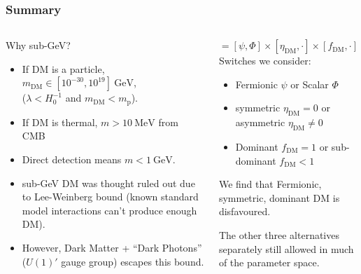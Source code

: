 \documentclass[aspectratio=169]{beamer}
\begin{document}
\begin{frame}
    \frametitle{Summary}

    \begin{columns}[t]
        \begin{block}{Why sub-GeV?}
            \begin{itemize}
                \item If DM is a particle, $m_\text{DM}\in[10^{-30},10^{19}]~\text{GeV}$, \\\hfill($\lambda<H_0^{-1}$ and $m_\text{DM} <m_\text{p}$).
                \item If DM is thermal, $m > 10~\text{MeV}$ from CMB
                \item Direct detection means $m<1~\text{GeV}$.
                \item sub-GeV DM was thought ruled out due to Lee-Weinberg bound (known standard model interactions can't produce enough DM).
                \item However, Dark Matter + ``Dark Photons'' ($U(1)'$ gauge group) escapes this bound.
            \end{itemize}
        \end{block}
        \begin{block}{$=[\psi,\Phi]\times[\eta_\text{DM},\cdot]\times[f_\text{DM},\cdot]$}
            Switches we consider:
            \begin{itemize}
                \item Fermionic $\psi$ or Scalar $\Phi$
                \item symmetric $\eta_\text{DM}=0$ or asymmetric $\eta_\text{DM}\ne0$
                \item Dominant $f_\text{DM}=1$ or sub-dominant $f_\text{DM}<1$
            \end{itemize}
            We find that Fermionic, symmetric, dominant DM is disfavoured.

            The other three alternatives separately still allowed in much of the parameter space.
        \end{block}
    \end{columns}


\end{frame}
\end{document}
